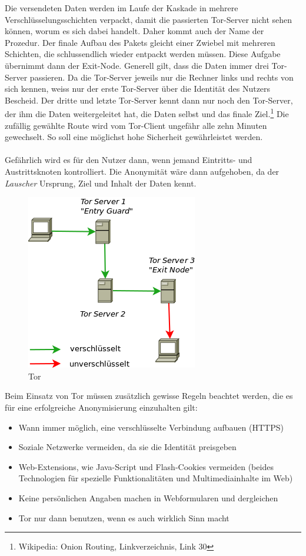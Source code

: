 Die versendeten Daten werden im Laufe der Kaskade in mehrere Verschlüsselungsschichten verpackt, damit die passierten Tor-Server nicht sehen können, worum es sich dabei handelt. Daher kommt auch der Name der Prozedur. Der finale Aufbau des Pakets gleicht einer Zwiebel mit mehreren Schichten, die  schlussendlich wieder entpackt werden müssen. Diese Aufgabe übernimmt dann der Exit-Node. Generell gilt, dass die Daten immer drei Tor-Server passieren. Da die Tor-Server jeweils nur die Rechner links und rechts von sich kennen, weiss nur der erste Tor-Server über die Identität des Nutzers Bescheid. Der dritte und letzte Tor-Server kennt dann nur noch den Tor-Server, der ihm die Daten weitergeleitet hat, die Daten selbst und das finale Ziel.\footnote{Wikipedia: Onion Routing, Linkverzeichnis, Link 30}
Die zufällig gewählte Route wird vom Tor-Client ungefähr alle zehn Minuten gewechselt. So soll eine möglichst hohe Sicherheit gewährleistet werden.
\\
\\
Gefährlich wird es für den Nutzer dann, wenn jemand Eintritts- und Austrittsknoten kontrolliert. Die Anonymität wäre dann aufgehoben, da der \textit{Lauscher} Ursprung, Ziel und Inhalt der Daten kennt.

\begin{figure}[H]
\centering
\includegraphics[scale=0.7]{images/tor}
\caption{Tor}
\end{figure}

Beim Einsatz von Tor müssen zusätzlich gewisse Regeln beachtet werden, die es für eine erfolgreiche Anonymisierung einzuhalten gilt:
\begin{itemize}
\item Wann immer möglich, eine verschlüsselte Verbindung aufbauen (HTTPS)
\item Soziale Netzwerke vermeiden, da sie die Identität preisgeben
\item Web-Extensions, wie Java-Script und Flash-Cookies vermeiden (beides Technologien für spezielle Funktionalitäten und Multimediainhalte im Web)
\item Keine persönlichen Angaben machen in Webformularen und dergleichen
\item Tor nur dann benutzen, wenn es auch wirklich Sinn macht
\end{itemize}

